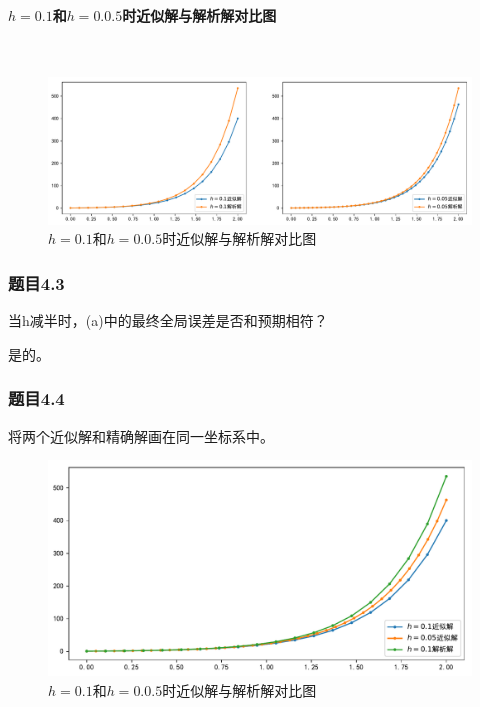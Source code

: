 \paragraph{$h=0.1$和$h=0.0.5$时近似解与解析解对比图}
~\\
\begin{figure}[H]
	\centering
	\caption{$h=0.1$和$h=0.0.5$时近似解与解析解对比图}
	\includegraphics[width=\linewidth]{fig36.pdf}
\end{figure}


\subsubsection{题目4.3}

当h减半时，(a)中的最终全局误差是否和预期相符？

是的。

\subsubsection{题目4.4}

将两个近似解和精确解画在同一坐标系中。

\begin{figure}[H]
	\centering
	\caption{$h=0.1$和$h=0.0.5$时近似解与解析解对比图}
	\includegraphics[width=\linewidth]{fig37.pdf}
\end{figure}